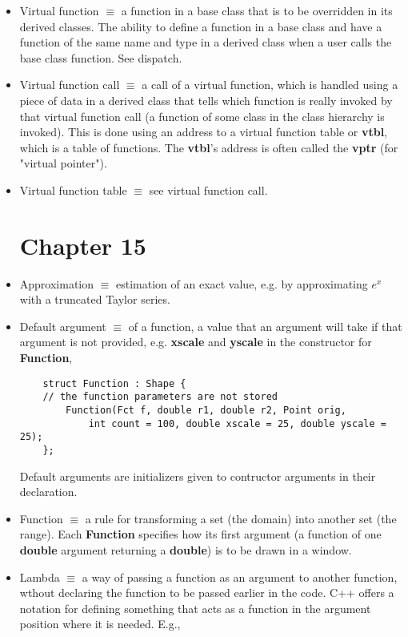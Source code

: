 \documentclass[12pt]{article}
\begin{document}
\begin{itemize}
\item Virtual function $\equiv$ a function in a base class that is to be overridden in its derived classes. The ability to define a function in a base class and have a function of the same name and type in a derived class when a user calls the base class function. See dispatch.

\item Virtual function call $\equiv$ a call of a virtual function, which is handled using a piece of data in a derived class that tells which function is really invoked by that virtual function call (a function of some class in the class hierarchy is invoked). This is done using an address to a virtual function table or \textbf{vtbl}, which is a table of functions. The \textbf{vtbl}'s address is often called the \textbf{vptr} (for "virtual pointer").

\item Virtual function table $\equiv$ see virtual function call.

\section*{Chapter 15}

\item Approximation $\equiv$ estimation of an exact value, e.g. by approximating $e^x$ with a truncated Taylor series.

\item Default argument $\equiv$ of a function, a value that an argument will take if that argument is not provided, e.g. \textbf{xscale} and \textbf{yscale} in the constructor for \textbf{Function},

\begin{lstlisting}
	struct Function : Shape {
	// the function parameters are not stored
		Function(Fct f, double r1, double r2, Point orig,
			int count = 100, double xscale = 25, double yscale = 25);
	};
\end{lstlisting}

Default arguments are initializers given to contructor arguments in their declaration.

\item Function $\equiv$ a rule for transforming a set (the domain) into another set (the range). Each \textbf{Function} specifies how its first argument (a function of one \textbf{double} argument returning a \textbf{double}) is to be drawn in a window. 

\item Lambda $\equiv$ a way of passing a function as an argument to another function, wthout declaring the function to be passed earlier in the code. C++ offers a notation for defining something that acts as a function in the argument position where it is needed. E.g.,


\end{itemize}
\end{document}
